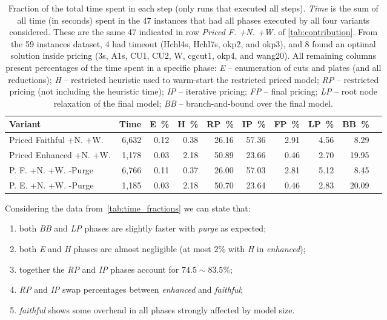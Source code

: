 \documentclass[smallextended]{svjour3}       %
\begin{document}
\begin{table}
\caption{Fraction of the total time spent in each step (only runs that executed all steps).
\emph{Time} is the sum of all time (in seconds) spent in the 47 instances that had all phases executed by all four variants considered.
These are the same 47 indicated in row \emph{Priced F. +N. +W.} of \autoref{tab:contribution}.
From the 59 instances dataset, 4 had timeout (Hchl4s, Hchl7s, okp2, and okp3), and 8 found an optimal solution inside pricing (3s, A1s, CU1, CU2, W, cgcut1, okp4, and wang20).
All remaining columns present percentages of the time spent in a specific phase:
\emph{E} -- enumeration of cuts and plates (and all reductions);
\emph{H} -- restricted heuristic used to warm-start the restricted priced model;
\emph{RP} -- restricted pricing (not including the heuristic time);
\emph{IP} -- iterative pricing;
\emph{FP} -- final pricing;
\emph{LP} -- root node relaxation of the final model;
\emph{BB} -- branch-and-bound over the final model.
}
\begin{tabular}{lrrrrrrrrr}
\hline\hline
Variant & Time & E~\% & H~\% & RP~\% & IP~\% & FP~\% & LP~\% & BB~\% \\\hline
Priced Faithful +N. +W. & 6,632 & 0.12 & 0.38 & 26.16 & 57.36 & 2.91 & 4.56 & 8.29 \\
Priced Enhanced +N. +W. & 1,178 & 0.03 & 2.18 & 50.89 & 23.66 & 0.46 & 2.70 & 19.95 \\
P. F. +N. +W. -Purge & 6,766 & 0.11 & 0.37 & 26.00 & 57.03 & 2.81 & 5.12 & 8.45 \\
P. E. +N. +W. -Purge & 1,185 & 0.03 & 2.18 & 50.70 & 23.64 & 0.46 & 2.83 & 20.09 \\\hline\hline
\end{tabular}
\label{tab:time_fractions}
\end{table}

Considering the data from~\autoref{tab:time_fractions} we can state that:
\begin{enumerate}
\item both \emph{BB} and \emph{LP} phases are slightly faster with \emph{purge} as expected;
\item both \emph{E} and \emph{H} phases are almost negligible (at most 2\% with \emph{H} in \emph{enhanced});
\item together the \emph{RP} and \emph{IP} phases account for \(74.5\sim83.5\)\%;
\item \emph{RP} and \emph{IP} swap percentages between \emph{enhanced} and \emph{faithful};
\item \emph{faithful} shows some overhead in all phases strongly affected by model size.
\end{enumerate}
\end{document}
